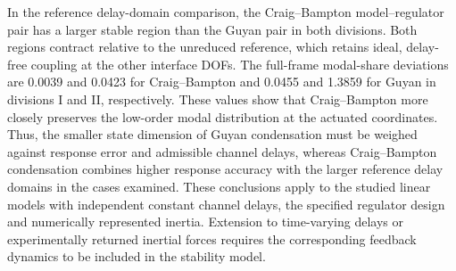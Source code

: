 \documentclass[a4paper,fleqn,review,12pt]{cas-sc}
\begin{document}
In the reference delay-domain comparison, the Craig--Bampton model--regulator pair has a larger stable region than the Guyan pair in both divisions. Both regions contract relative to the unreduced reference, which retains ideal, delay-free coupling at the other interface DOFs. The full-frame modal-share deviations are 0.0039 and 0.0423 for Craig--Bampton and 0.0455 and 1.3859 for Guyan in divisions I and II, respectively. These values show that Craig--Bampton more closely preserves the low-order modal distribution at the actuated coordinates. Thus, the smaller state dimension of Guyan condensation must be weighed against response error and admissible channel delays, whereas Craig--Bampton condensation combines higher response accuracy with the larger reference delay domains in the cases examined. These conclusions apply to the studied linear models with independent constant channel delays, the specified regulator design and numerically represented inertia. Extension to time-varying delays or experimentally returned inertial forces requires the corresponding feedback dynamics to be included in the stability model.


\FloatBarrier


\end{document}
